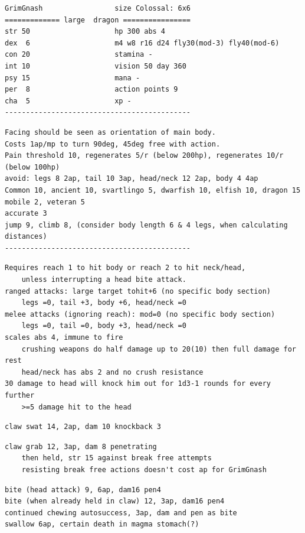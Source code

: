 \goodbreak \small \begin{samepage} \begin{verbatim}
GrimGnash                 size Colossal: 6x6
============= large  dragon ================
str 50                    hp 300 abs 4
dex  6                    m4 w8 r16 d24 fly30(mod-3) fly40(mod-6)
con 20                    stamina -
int 10                    vision 50 day 360
psy 15                    mana -
per  8                    action points 9
cha  5                    xp -
--------------------------------------------
\end{verbatim} \goodbreak \begin{verbatim}
Facing should be seen as orientation of main body.
Costs 1ap/mp to turn 90deg, 45deg free with action.
Pain threshold 10, regenerates 5/r (below 200hp), regenerates 10/r (below 100hp)
avoid: legs 8 2ap, tail 10 3ap, head/neck 12 2ap, body 4 4ap
Common 10, ancient 10, svartlingo 5, dwarfish 10, elfish 10, dragon 15
mobile 2, veteran 5
accurate 3
jump 9, climb 8, (consider body length 6 & 4 legs, when calculating distances)
--------------------------------------------
\end{verbatim} \goodbreak \begin{verbatim}
Requires reach 1 to hit body or reach 2 to hit neck/head, 
    unless interrupting a head bite attack.
ranged attacks: large target tohit+6 (no specific body section)
    legs =0, tail +3, body +6, head/neck =0
melee attacks (ignoring reach): mod=0 (no specific body section)
    legs =0, tail =0, body +3, head/neck =0
scales abs 4, immune to fire
    crushing weapons do half damage up to 20(10) then full damage for rest
    head/neck has abs 2 and no crush resistance
30 damage to head will knock him out for 1d3-1 rounds for every further
    >=5 damage hit to the head

\end{verbatim} \goodbreak \begin{verbatim}
claw swat 14, 2ap, dam 10 knockback 3

\end{verbatim} \goodbreak \begin{verbatim}
claw grab 12, 3ap, dam 8 penetrating
    then held, str 15 against break free attempts
    resisting break free actions doesn't cost ap for GrimGnash

\end{verbatim} \goodbreak \begin{verbatim}
bite (head attack) 9, 6ap, dam16 pen4 
bite (when already held in claw) 12, 3ap, dam16 pen4
continued chewing autosuccess, 3ap, dam and pen as bite
swallow 6ap, certain death in magma stomach(?)


\end{verbatim}
\end{samepage}
